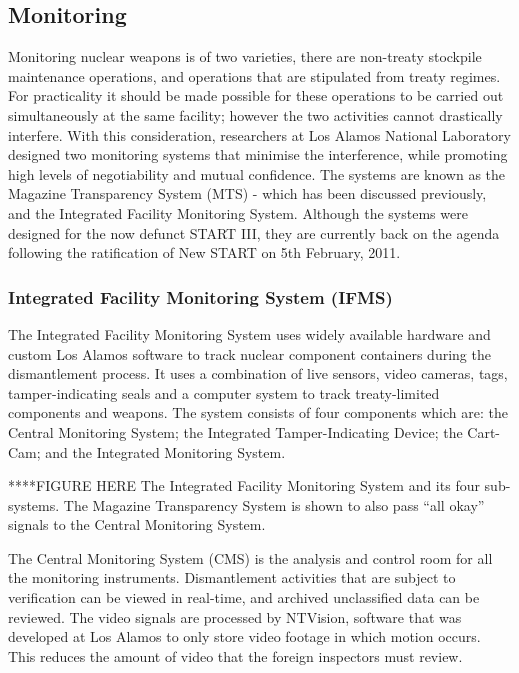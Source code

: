\documentclass[twoside,titlepage,11pt,twocolumn,a4paper]{article}
\begin{document}
\subsection{Monitoring}
Monitoring nuclear weapons is of two varieties, there are non-treaty 
stockpile maintenance operations, and operations that are stipulated 
from treaty regimes. For practicality it should be made possible for 
these operations to be carried out simultaneously at the same facility; 
however the two activities cannot drastically interfere. With this 
consideration, researchers at Los Alamos National Laboratory designed 
two monitoring systems that minimise the interference, while promoting 
high levels of negotiability and mutual confidence. The systems are 
known as the Magazine Transparency System (MTS) - which has been 
discussed previously, and the Integrated Facility Monitoring System. 
Although the systems were designed for the now defunct START III, 
they are currently back on the agenda following the ratification of 
New START on 5th February, 2011. 

\subsubsection{Integrated Facility Monitoring System (IFMS)}
The Integrated Facility Monitoring System uses widely available 
hardware and custom Los Alamos software to track nuclear component 
containers during the dismantlement process. It uses a combination 
of live sensors, video cameras, tags, tamper-indicating seals and 
a computer system to track treaty-limited components and weapons. 
The system consists of four components which are: the Central 
Monitoring System; the Integrated Tamper-Indicating Device; 
the Cart-Cam; and the Integrated Monitoring System. 

****FIGURE HERE The Integrated Facility Monitoring System and 
its four sub-systems. The Magazine Transparency System is shown 
to also pass ``all okay'' signals to the Central Monitoring System. 
\citep{gerdes2001}

The Central Monitoring System (CMS) is the analysis and control 
room for all the monitoring instruments. Dismantlement activities 
that are subject to verification can be viewed in real-time, and 
archived unclassified data can be reviewed. The video signals are 
processed by NTVision, software that was developed at Los Alamos 
to only store video footage in which motion occurs. This reduces 
the amount of video that the foreign inspectors must review.
\end{document}
